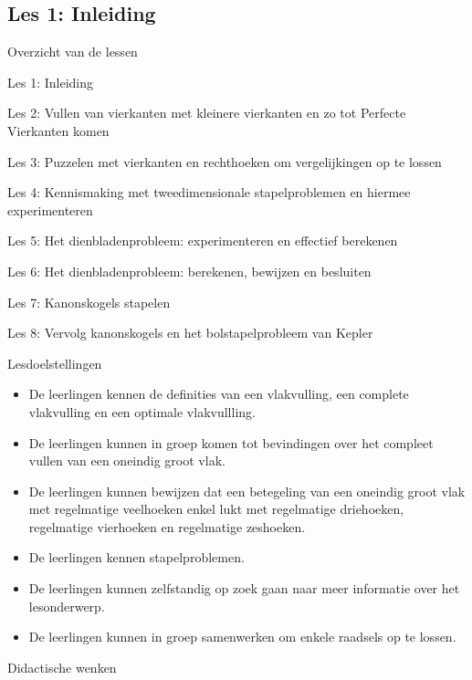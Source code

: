 \documentclass[dutch]{beamer}
\begin{document}
\subsection{Les 1: Inleiding}
\begin{frame}
{Overzicht van de lessen}
\begin{list}{\quad}{}
\item {\color{blue}Les 1: Inleiding}
\item Les 2: Vullen van vierkanten met kleinere vierkanten en zo tot Perfecte Vierkanten komen
\item Les 3: Puzzelen met vierkanten en rechthoeken om vergelijkingen op te lossen
\item Les 4: Kennismaking met tweedimensionale stapelproblemen en hiermee experimenteren
\item Les 5: Het dienbladenprobleem: experimenteren en effectief berekenen
\item Les 6: Het dienbladenprobleem: berekenen, bewijzen en besluiten
\item Les 7: Kanonskogels stapelen
\item Les 8: Vervolg kanonskogels en het bolstapelprobleem van Kepler
\end{list}
\end{frame}

\begin{frame}{Lesdoelstellingen}
\begin{itemize}
\item De leerlingen kennen de definities van een vlakvulling, een complete vlakvulling en een optimale vlakvullling.
\item De leerlingen kunnen in groep komen tot bevindingen over het compleet vullen van een oneindig groot vlak.
\item De leerlingen kunnen bewijzen dat een betegeling van een oneindig groot vlak met regelmatige veelhoeken enkel lukt met regelmatige driehoeken, regelmatige vierhoeken en regelmatige zeshoeken.
\item De leerlingen kennen stapelproblemen.
\item De leerlingen kunnen zelfstandig op zoek gaan naar meer informatie over het lesonderwerp.
\item De leerlingen kunnen in groep samenwerken om enkele raadsels op te lossen.
\end{itemize}
\end{frame}

\begin{frame}{Didactische wenken}

\end{frame}
\end{document}
